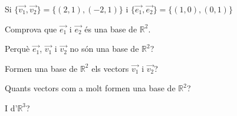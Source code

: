 \Exercise Si $\{\overrightarrow{v_1},\overrightarrow{v_2}\} = \{ (2,1),(-2,1) \}$ i $\{\overrightarrow{e_1},\overrightarrow{e_2}\} = \{ (1,0),(0,1) \}$
\begin{llista}
  \item Comprova que $\overrightarrow{e_1}$ i $\overrightarrow{e_2}$ és una base de $\mathbb{R}^2$.
  \item Perquè $\overrightarrow{e_1}$, $\overrightarrow{v_1}$ i $\overrightarrow{v_2}$ no són una base de $\mathbb{R}^2$?
  \item Formen una base de $\mathbb{R}^2$ els vectors $\overrightarrow{v_1}$ i $\overrightarrow{v_2}$?
  \item Quants vectors com a molt formen una base de $\mathbb{R}^2$?
  \item I d'$\mathbb{R}^3$?
\end{llista}

